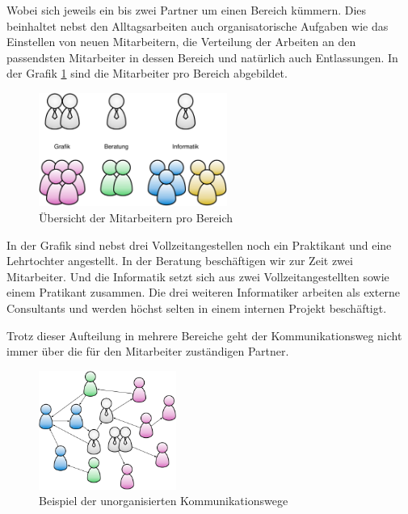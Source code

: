 Wobei sich jeweils ein bis zwei Partner um einen
Bereich kümmern. Dies beinhaltet nebst den Alltagsarbeiten auch organisatorische 
Aufgaben wie das Einstellen von neuen Mitarbeitern, die Verteilung der Arbeiten an den 
passendsten Mitarbeiter in dessen Bereich und natürlich auch Entlassungen.
In der Grafik \ref{pic:mitarbeiter_pro_bereich} sind die Mitarbeiter pro Bereich
abgebildet.

\begin{figure}[htbp]
\begin{center}
\includegraphics[width=0.55\textwidth,angle=0]{./bilder/mitarbeiter_pro_bereich.pdf}
\caption{Übersicht der Mitarbeitern pro Bereich}
\label{pic:mitarbeiter_pro_bereich}
\end{center}
\end{figure}

In der Grafik sind nebst drei Vollzeitangestellen noch ein Praktikant und eine
Lehrtochter angestellt. In der Beratung beschäftigen wir zur Zeit zwei Mitarbeiter.
Und die Informatik setzt sich aus zwei Vollzeitangestellten sowie einem Pratikant
zusammen. Die drei weiteren Informatiker arbeiten als externe Consultants und
werden höchst selten in einem internen Projekt beschäftigt.

Trotz dieser Aufteilung in mehrere Bereiche geht der Kommunikationsweg nicht
immer über die für den Mitarbeiter zuständigen Partner. 

\begin{figure}[htbp]
\begin{center}
\includegraphics[width=0.40\textwidth,angle=0]{./bilder/kommunikationswege.pdf}
\caption{Beispiel der unorganisierten Kommunikationswege}
\label{pic:kommunikationswege}
\end{center}
\end{figure}

